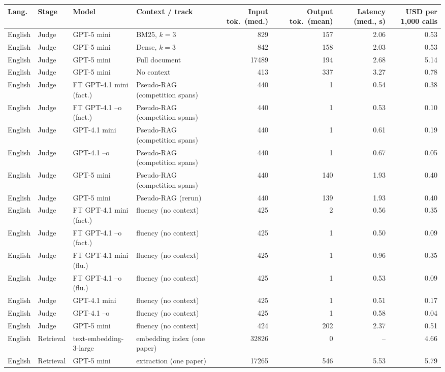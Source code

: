 \begin{tabular}{llllrrrr}
\hline
\textbf{Lang.} & \textbf{Stage} & \textbf{Model} & \textbf{Context / track} & \textbf{Input tok.\ (med.)} & \textbf{Output tok.\ (mean)} & \textbf{Latency (med., s)} & \textbf{USD per 1{,}000 calls} \\
\hline
English & Judge & GPT-5 mini & BM25, $k=3$ & 829 & 157 & 2.06 & 0.53 \\
English & Judge & GPT-5 mini & Dense, $k=3$ & 842 & 158 & 2.03 & 0.53 \\
English & Judge & GPT-5 mini & Full document & 17489 & 194 & 2.68 & 5.14 \\
English & Judge & GPT-5 mini & No context & 413 & 337 & 3.27 & 0.78 \\
English & Judge & FT GPT-4.1 mini (fact.) & Pseudo-RAG (competition spans) & 440 & 1 & 0.54 & 0.38 \\
English & Judge & FT GPT-4.1 --o (fact.) & Pseudo-RAG (competition spans) & 440 & 1 & 0.53 & 0.10 \\
English & Judge & GPT-4.1 mini & Pseudo-RAG (competition spans) & 440 & 1 & 0.61 & 0.19 \\
English & Judge & GPT-4.1 --o & Pseudo-RAG (competition spans) & 440 & 1 & 0.67 & 0.05 \\
English & Judge & GPT-5 mini & Pseudo-RAG (competition spans) & 440 & 140 & 1.93 & 0.40 \\
English & Judge & GPT-5 mini & Pseudo-RAG (rerun) & 440 & 139 & 1.93 & 0.40 \\
English & Judge & FT GPT-4.1 mini (fact.) & fluency (no context) & 425 & 2 & 0.56 & 0.35 \\
English & Judge & FT GPT-4.1 --o (fact.) & fluency (no context) & 425 & 1 & 0.50 & 0.09 \\
English & Judge & FT GPT-4.1 mini (flu.) & fluency (no context) & 425 & 1 & 0.96 & 0.35 \\
English & Judge & FT GPT-4.1 --o (flu.) & fluency (no context) & 425 & 1 & 0.53 & 0.09 \\
English & Judge & GPT-4.1 mini & fluency (no context) & 425 & 1 & 0.51 & 0.17 \\
English & Judge & GPT-4.1 --o & fluency (no context) & 425 & 1 & 0.58 & 0.04 \\
English & Judge & GPT-5 mini & fluency (no context) & 424 & 202 & 2.37 & 0.51 \\
English & Retrieval & text-embedding-3-large & embedding index (one paper) & 32826 & 0 & -- & 4.66 \\
English & Retrieval & GPT-5 mini & extraction (one paper) & 17265 & 546 & 5.53 & 5.79 \\

\end{tabular}
